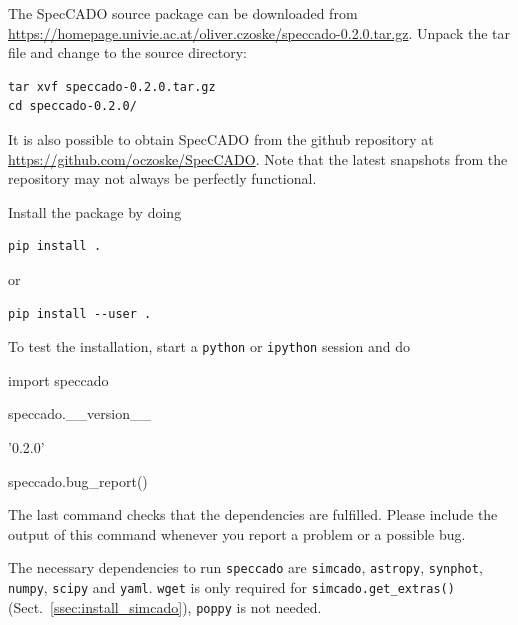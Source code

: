 \documentclass[a4paper,twoside,11pt]{article}
\begin{document}
The SpecCADO source package can be downloaded from
\url{https://homepage.univie.ac.at/oliver.czoske/speccado-0.2.0.tar.gz}. Unpack
the tar file and change to the source directory:
\begin{lstlisting}[style=csh]
tar xvf speccado-0.2.0.tar.gz
cd speccado-0.2.0/
\end{lstlisting}
It is also possible to obtain SpecCADO from the github repository at
\url{https://github.com/oczoske/SpecCADO}. Note that the latest
snapshots from the repository may not always be perfectly functional.

Install the package by doing
\begin{lstlisting}[style=csh]
pip install .
\end{lstlisting}
or
\begin{lstlisting}[style=csh]
pip install --user .
\end{lstlisting}

To test the installation, start a \lstinline{python} or
\lstinline{ipython} session and do
\begin{pyin}
  import speccado
\end{pyin}

\begin{pyin}
speccado.__version__
\end{pyin}
\begin{pyout}
'0.2.0'
\end{pyout}
\begin{pyin}
speccado.bug_report()
\end{pyin}

The last command checks that the dependencies are fulfilled. Please
include the output of this command whenever you report a problem or a
possible bug.

The necessary dependencies to run \lstinline{speccado} are
\lstinline{simcado}, \lstinline{astropy}, \lstinline{synphot},
\lstinline{numpy}, \lstinline{scipy} and
\lstinline{yaml}. \lstinline{wget} is only required for
\lstinline{simcado.get_extras()} (Sect.~\ref{ssec:install_simcado}),
\lstinline{poppy} is not needed.
\end{document}
